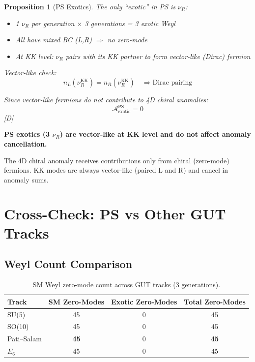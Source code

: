 \documentclass[11pt,a4paper]{article}
\newtheorem{proposition}[theorem]{Proposition}
\newcommand{\tagD}{\textcolor{blue!70!black}{[D]}}
\begin{document}
\begin{proposition}[PS Exotics]
\label{prop:ps-exotics}
The only ``exotic'' in PS is $\nu_R$:
\begin{itemize}
    \item 1 $\nu_R$ per generation $\times$ 3 generations = 3 exotic Weyl
    \item All have mixed BC (L,R) $\Rightarrow$ no zero-mode
    \item At KK level: $\nu_R$ pairs with its KK partner to form vector-like (Dirac) fermion
\end{itemize}

Vector-like check:
\begin{equation}
\label{eq:ps-exotic-vector}
n_L(\nu_R^{\text{KK}}) = n_R(\nu_R^{\text{KK}}) \quad \Rightarrow \text{Dirac pairing}
\end{equation}

Since vector-like fermions do not contribute to 4D chiral anomalies:
\begin{equation}
\label{eq:ps-exotic-anomaly}
\mathcal{A}_{\text{exotic}}^{\text{PS}} = 0
\end{equation}
\tagD
\end{proposition}

\begin{trapbox}
\textbf{PS exotics (3 $\nu_R$) are vector-like at KK level and do not affect anomaly cancellation.}

The 4D chiral anomaly receives contributions only from chiral (zero-mode) fermions.
KK modes are always vector-like (paired L and R) and cancel in anomaly sums.
\end{trapbox}

\section{Cross-Check: PS vs Other GUT Tracks}
\label{sec:cross-check}

\subsection{Weyl Count Comparison}

\begin{table}[h]
\centering
\caption{SM Weyl zero-mode count across GUT tracks (3 generations).}
\label{tab:weyl-comparison}
\begin{tabular}{lccc}
\toprule
Track & SM Zero-Modes & Exotic Zero-Modes & Total Zero-Modes \\
\midrule
SU(5) & 45 & 0 & 45 \\
SO(10) & 45 & 0 & 45 \\
Pati--Salam & \textbf{45} & 0 & \textbf{45} \\
$E_6$ & 45 & 0 & 45 \\
\bottomrule
\end{tabular}
\end{table}
\end{document}
